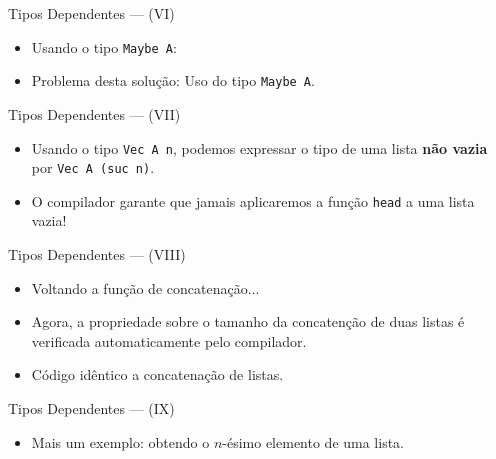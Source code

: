\documentclass{beamer}
\begin{document}
       \begin{frame}{Tipos Dependentes --- (VI)}
         \begin{itemize}
           \item Usando o tipo \texttt{Maybe A}:
         \end{itemize}
         \begin{itemize}
           \item Problema desta solu\c{c}\~ao: Uso do tipo \texttt{Maybe A}.
         \end{itemize}
       \end{frame}

       \begin{frame}{Tipos Dependentes --- (VII)}
         \begin{itemize}
           \item Usando o tipo \texttt{Vec A n}, podemos expressar o tipo de uma lista \textbf{n\~ao vazia} por
                 \texttt{Vec A (suc n)}. 
           \item O compilador garante que jamais aplicaremos a fun\c{c}\~ao \texttt{head} a uma lista vazia!
         \end{itemize} 
       \end{frame}

       \begin{frame}{Tipos Dependentes --- (VIII)}
         \begin{itemize}
           \item Voltando a fun\c{c}\~ao de concatena\c{c}\~ao...
         \end{itemize}
         \begin{itemize}
           \item Agora, a propriedade sobre o tamanho da concaten\c{c}\~ao de duas listas \'e verificada automaticamente pelo compilador.
           \item C\'odigo id\^entico a concatena\c{c}\~ao de listas.
         \end{itemize}
       \end{frame}
       
       \begin{frame}{Tipos Dependentes --- (IX)}
         \begin{itemize}
           \item Mais um exemplo: obtendo o $n$-\'esimo elemento de uma lista.
         \end{itemize}
       \end{frame}
\end{document}

